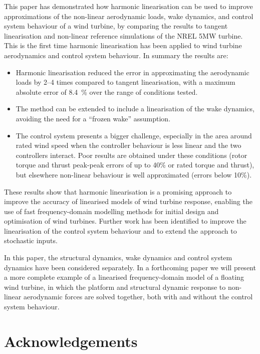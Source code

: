 \documentclass[a4paper,preprint]{elsarticle}
\begin{document}
This paper has demonstrated how harmonic linearisation can be used to improve
approximations of the non-linear aerodynamic loads, wake dynamics, and control
system behaviour of a wind turbine, by comparing the results to tangent
linearisation and non-linear reference simulations of the NREL 5MW turbine. This
is the first time harmonic linearisation has been applied to wind turbine
aerodynamics and control system behaviour. In summary the results are:
\begin{itemize}
\item Harmonic linearisation reduced the error in approximating the aerodynamic
  loads by 2--4 times compared to tangent linearisation, with a maximum absolute
  error of \SI{8.4}{\percent} over the range of conditions tested.
\item The method can be extended to include a linearisation of the wake
  dynamics, avoiding the need for a ``frozen wake'' assumption.
\item The control system presents a bigger challenge, especially in the area
  around rated wind speed when the controller behaviour is less linear and the
  two controllers interact. Poor results are obtained under these conditions
  (rotor torque and thrust peak-peak errors of up to 40\% or rated torque and
  thrust), but elsewhere non-linear behaviour is well approximated (errors below
  10\%). 
\end{itemize}

These results show that harmonic linearisation is a promising approach to
improve the accuracy of linearised models of wind turbine response, enabling the
use of fast frequency-domain modelling methods for initial design and
optimisation of wind turbines. Further work has been identified to improve the
linearisation of the control system behaviour and to extend the approach to
stochastic inputs.

In this paper, the structural dynamics, wake dynamics and control system
dynamics have been considered separately. In a forthcoming paper we will present
a more complete example of a linearised frequency-domain model of a floating
wind turbine, in which the platform and structural dynamic response to
non-linear aerodynamic forces are solved together, both with and without the
control system behaviour.


\section*{Acknowledgements}
\end{document}
